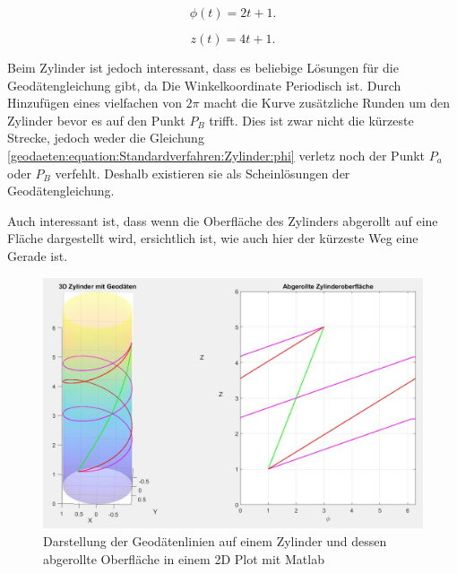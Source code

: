 \begin{equation}
	\phi(t) = 2t + 1 .
\end{equation}

\begin{equation}
	z(t) = 4t + 1 .
\end{equation}

Beim Zylinder ist jedoch interessant, dass es beliebige Lösungen für die Geodätengleichung gibt, da Die Winkelkoordinate Periodisch ist.
Durch Hinzufügen eines vielfachen von $2\pi$ macht die Kurve zusätzliche Runden um den Zylinder bevor es auf den Punkt $P_B$ trifft.
Dies ist zwar nicht die kürzeste Strecke, jedoch weder die Gleichung \ref{geodaeten:equation:Standardverfahren:Zylinder:phi} verletz noch der Punkt $P_a$ oder $P_B$ verfehlt.
Deshalb existieren sie als Scheinlösungen der Geodätengleichung.

Auch interessant ist, dass wenn die Oberfläche des Zylinders abgerollt auf eine Fläche dargestellt wird, ersichtlich ist, wie auch hier der kürzeste Weg eine Gerade ist.  

\begin{figure}
	\centering
	\includegraphics[width=14cm]{papers/geodaeten/Abbildungen/Standardverfahren/Zylinder}
	\caption{Darstellung der Geodätenlinien auf einem Zylinder und dessen abgerollte Oberfläche in einem 2D Plot mit Matlab}
	\label{geodaeten:figure:Linienelemente:Zylinder:figure1}
\end{figure}
